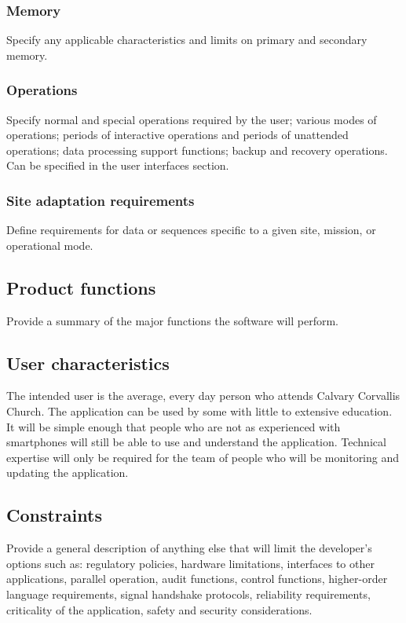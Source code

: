 \documentclass[letterpaper,10pt,draftclsnofoot,onecolumn,titlepage]{IEEEtran}
\begin{document}
	\subsubsection{Memory}
	Specify any applicable characteristics and limits on primary and secondary memory.

	\subsubsection{Operations}
	Specify normal and special operations required by the user; various modes of operations; periods of interactive operations and periods of unattended operations; data processing support functions; backup and recovery operations.
	Can be specified in the user interfaces section.

	\subsubsection{Site adaptation requirements}
	Define requirements for data or sequences specific to a given site, mission, or operational mode.

	\subsection{Product functions}
	Provide a summary of the major functions the software will perform.

	\subsection{User characteristics}
	The intended user is the average, every day person who attends Calvary Corvallis Church.
	The application can be used by some with little to extensive education.
	It will be simple enough that people who are not as experienced with smartphones will still be able to use and understand the application.
	Technical expertise will only be required for the team of people who will be monitoring and updating the application.

	\subsection{Constraints}
	Provide a general description of anything else that will limit the developer's options such as: regulatory policies, hardware limitations, interfaces to other applications, parallel operation, audit functions, control functions, higher-order language requirements, signal handshake protocols, reliability requirements, criticality of the application, safety and security considerations.
\end{document}
